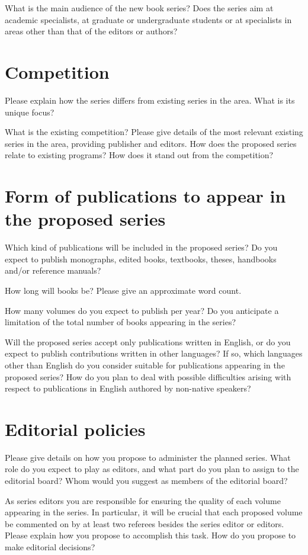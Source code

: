 What is the main audience of the new book series? Does the series
aim at academic specialists, at graduate or undergraduate students
or at specialists in areas other than that of the editors or authors?


\section{Competition}

Please explain how the series differs from existing series in the
area. What is its unique focus?

What is the existing competition? Please give details of the most
relevant existing series in the area, providing publisher and editors.
How does the proposed series relate to existing programs? How does
it stand out from the competition?


\section{Form of publications to appear in the proposed series}

Which kind of publications will be included in the proposed series?
Do you expect to publish monographs, edited books, textbooks, theses,
handbooks and/or reference manuals?

How long will books be? Please give an approximate word count.

How many volumes do you expect to publish per year? Do you anticipate
a limitation of the total number of books appearing in the series?

Will the proposed series accept only publications written in English,
or do you expect to publish contributions written in other languages?
If so, which languages other than English do you consider suitable
for publications appearing in the proposed series? How do you plan
to deal with possible difficulties arising with respect to publications
in English authored by non-native speakers?


\section{Editorial policies}

Please give details on how you propose to administer the planned series.
What role do you expect to play as editors, and what part do you plan
to assign to the editorial board? Whom would you suggest as members
of the editorial board?

As series editors you are responsible for ensuring the quality of
each volume appearing in the series. In particular, it will be crucial
that each proposed volume be commented on by at least two referees
besides the series editor or editors. Please explain how you propose
to accomplish this task. How do you propose to make editorial decisions?

